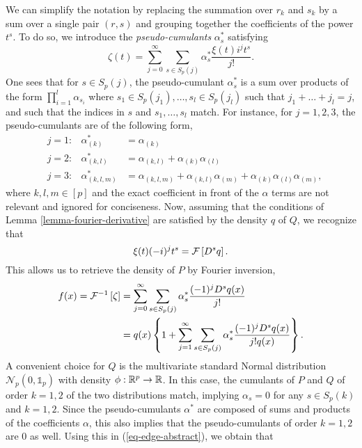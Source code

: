 We can simplify the notation by replacing the summation over $r_k$ and $s_k$ by a sum over a single pair $(r, s)$ and grouping together the coefficients of the power $t^s$. To do so, we introduce the \textit{pseudo-cumulants} $\alpha^*_s$ satisfying
\begin{equation} \label{eq-char-expansion}
    \zeta(t) = 
    \sum_{j=0}^\infty 
    \sum_{s \in S_p(j)}
    \alpha^*_s \frac{\xi(t) i^{j} t^{s}}{j!}.
\end{equation}
One sees that for $s \in S_p(j)$, the pseudo-cumulant $\alpha^*_s$ is a sum over products of the form $ \prod_{i=1}^l \alpha_{s_i}$ where $s_1 \in S_p(j_1), \ldots, s_l \in S_p(j_l)$ such that $j_1 + \ldots + j_l = j$, and such that the indices in $s$ and $s_1, \ldots, s_l$ match. For instance, for $j = 1, 2, 3$, the pseudo-cumulants are of the following form,
\begin{align*}
    &j = 1:& \alpha^*_{(k)} &= \alpha_{(k)} \\
    &j = 2:&\alpha^*_{(k, l)} &= \alpha_{(k, l)} + \alpha_{(k)}\alpha_{(l)}\\
    &j = 3:&\alpha^*_{(k, l, m)} &= \alpha_{(k, l, m)} + \alpha_{(k, l)}\alpha_{(m)} + \alpha_{(k)}\alpha_{(l)}\alpha_{(m)},
\end{align*}
where $k,l,m \in [p]$ and the exact coefficient in front of the $\alpha$ terms are not relevant and ignored for conciseness. Now, assuming that the conditions of Lemma \ref{lemma-fourier-derivative} are satisfied by the density $q$ of $Q$, we recognize that
\begin{equation*}
    \xi(t) (-i)^{j} t^s  = \mathcal{F} \left[ D^s q \right].
\end{equation*}
This allows us to retrieve the density of $P$ by Fourier inversion,
\begin{align}\label{eq-edge-abstract}
    f(x) = \mathcal{F}^{-1}\left[\zeta\right] &= 
    \sum_{j=0}^\infty 
    \sum_{s \in S_p(j)}
    \alpha^*_s \frac{(-1)^j D^s q(x)}{j!}\nonumber\\
    &= 
    q(x) \left\{ 1 + \sum_{j=1}^\infty 
    \sum_{s \in S_p(j)}
    \alpha^*_s \frac{(-1)^j D^s q(x)}{j! q(x)}\right\}.
\end{align}
A convenient choice for $Q$ is the multivariate standard Normal distribution $\mathcal{N}_p(0, \mathbb{1}_p)$ with density $\phi : {\mathbb{R}^p} \rightarrow \mathbb{R}$. In this case, the cumulants of $P$ and $Q$ of order $k=1,2$ of the two distributions match, implying $\alpha_s = 0$ for any $s \in S_p(k)$ and $k=1,2$. Since the pseudo-cumulants $\alpha^*$ are composed of sums and products of the coefficients $\alpha$, this also implies that the pseudo-cumulants of order $k=1,2$ are 0 as well. Using this in (\ref{eq-edge-abstract}), we obtain that
